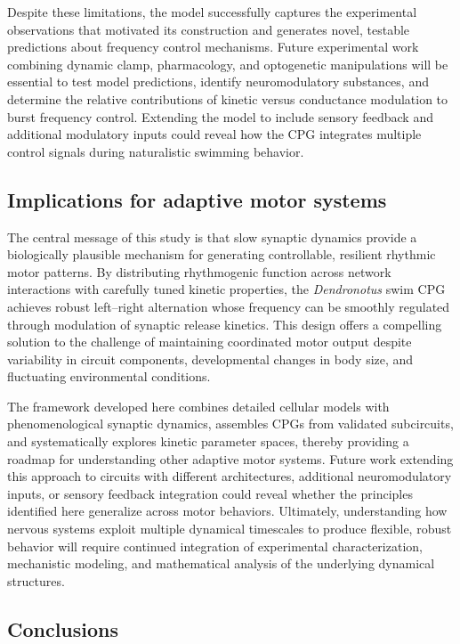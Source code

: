 \documentclass[nofootinbib,aip,amsmath,amssymb,preprint,twocolumn,floatfix,10pt]{revtex4-2}
\begin{document}
Despite these limitations, the model successfully captures the experimental observations that motivated its construction and generates novel, testable predictions about frequency control mechanisms. Future experimental work combining dynamic clamp, pharmacology, and optogenetic manipulations will be essential to test model predictions, identify neuromodulatory substances, and determine the relative contributions of kinetic versus conductance modulation to burst frequency control. Extending the model to include sensory feedback and additional modulatory inputs could reveal how the CPG integrates multiple control signals during naturalistic swimming behavior.

\subsection{Implications for adaptive motor systems}

The central message of this study is that slow synaptic dynamics provide a biologically plausible mechanism for generating controllable, resilient rhythmic motor patterns. By distributing rhythmogenic function across network interactions with carefully tuned kinetic properties, the \textit{Dendronotus} swim CPG achieves robust left--right alternation whose frequency can be smoothly regulated through modulation of synaptic release kinetics. This design offers a compelling solution to the challenge of maintaining coordinated motor output despite variability in circuit components, developmental changes in body size, and fluctuating environmental conditions.

The framework developed here combines detailed cellular models with phenomenological synaptic dynamics, assembles CPGs from validated subcircuits, and systematically explores kinetic parameter spaces, thereby providing a roadmap for understanding other adaptive motor systems. Future work extending this approach to circuits with different architectures, additional neuromodulatory inputs, or sensory feedback integration could reveal whether the principles identified here generalize across motor behaviors. Ultimately, understanding how nervous systems exploit multiple dynamical timescales to produce flexible, robust behavior will require continued integration of experimental characterization, mechanistic modeling, and mathematical analysis of the underlying dynamical structures.

\subsection{Conclusions}
\end{document}
